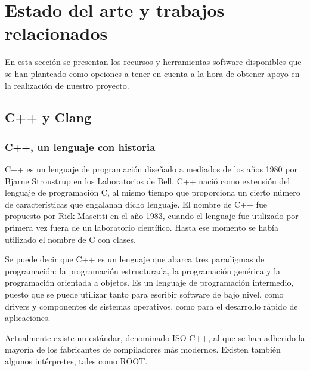 \section{Estado del arte y trabajos relacionados}

En esta secci\'on se presentan los recursos y herramientas software disponibles que se han planteado como opciones a tener en cuenta a la hora de obtener apoyo en la realizaci\'on de nuestro proyecto.

\subsection{C++ y Clang}

\subsubsection*{C++, un lenguaje con historia}
\label{ap2:sec:c++}

C++ es un lenguaje de programaci\'on dise\~nado a mediados de los a\~nos 1980 por Bjarne Stroustrup en los Laboratorios de Bell. C++ naci\'o como extensi\'on del lenguaje de programaci\'on C, al mismo tiempo que proporciona un cierto n\'umero de caracter\'isticas que engalanan dicho lenguaje. El nombre de C++ fue propuesto por Rick Mascitti en el a\~no 1983, cuando el lenguaje fue utilizado por primera vez fuera de un laboratorio cient\'ifico. Hasta ese momento se hab\'ia utilizado el nombre de C con clases. 

Se puede decir que C++ es un lenguaje que abarca tres paradigmas de programaci\'on: la programaci\'on estructurada, la programaci\'on gen\'erica y la programaci\'on orientada a objetos. Es un lenguaje de programaci\'on intermedio, puesto que se puede utilizar tanto para escribir software de bajo nivel, como drivers y componentes de sistemas operativos, como para el desarrollo r\'apido de aplicaciones.

Actualmente existe un est\'andar, denominado ISO C++, al que se han adherido la mayor\'ia de los fabricantes de compiladores m\'as modernos. Existen tambi\'en algunos int\'erpretes, tales como ROOT.

